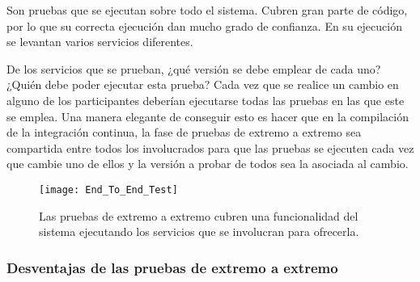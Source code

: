 \documentclass[11pt,a4paper]{article}
\begin{document}
Son pruebas que se ejecutan sobre todo el sistema. Cubren gran parte de código, por lo que su correcta ejecución dan mucho grado de confianza. En su ejecución se levantan varios servicios diferentes.

De los servicios que se prueban, ¿qué versión se debe emplear de cada uno? ¿Quién debe poder ejecutar esta prueba? Cada vez que se realice un cambio en alguno de los participantes deberían ejecutarse todas las pruebas en las que este se emplea. Una manera elegante de conseguir esto es hacer que en la compilación de la integración continua, la fase de pruebas de extremo a extremo sea compartida entre todos los involucrados para que las pruebas se ejecuten cada vez que cambie uno de ellos y la versión a probar de todos sea la asociada al cambio.

\begin{figure}[h]
\centering
\texttt{[image: End\_To\_End\_Test]}
\caption{Las pruebas de extremo a extremo cubren una funcionalidad del sistema ejecutando los servicios que se involucran para ofrecerla.}
\end{figure}

\subsubsection{Desventajas de las pruebas de extremo a extremo}
\end{document}
